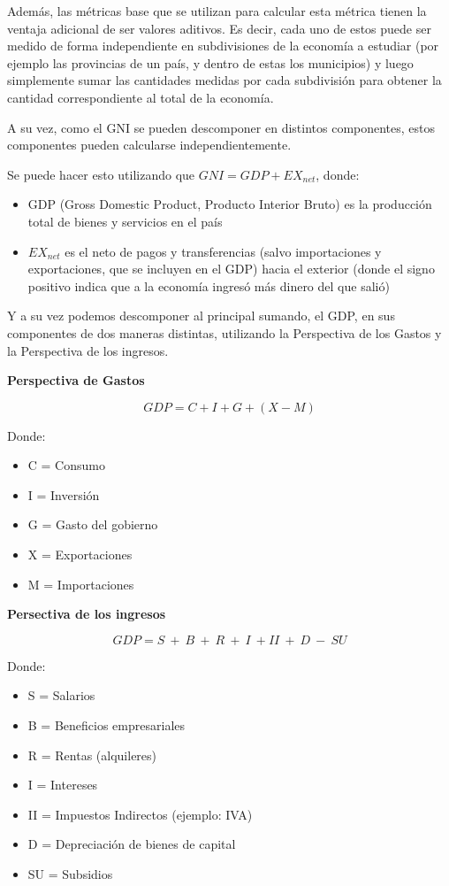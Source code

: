 Además, las métricas base que se utilizan para calcular esta métrica tienen la ventaja adicional de ser valores aditivos. Es decir, cada uno de estos puede ser medido de forma independiente en subdivisiones de la economía a estudiar (por ejemplo las provincias de un país, y dentro de estas los municipios) y luego simplemente sumar las cantidades medidas por cada subdivisión para obtener la cantidad correspondiente al total de la economía. 

A su vez, como el GNI se pueden descomponer en distintos componentes, estos componentes pueden calcularse independientemente.

Se puede hacer esto utilizando que $GNI = GDP + EX_{net}$, donde:
\begin{itemize}
    \item GDP (Gross Domestic Product, Producto Interior Bruto) es la producción total de bienes y servicios en el país
    \item $EX_{net}$ es el neto de pagos y transferencias (salvo importaciones y exportaciones, que se incluyen en el GDP) hacia el exterior (donde el signo positivo indica que a la economía ingresó más dinero del que salió)
\end{itemize}

Y a su vez podemos descomponer al principal sumando, el GDP, en sus componentes de dos maneras distintas, utilizando la Perspectiva de los Gastos y la Perspectiva de los ingresos.

\textbf{Perspectiva de Gastos}

$$
GDP = C + I + G + (X-M)
$$

Donde:
\begin{itemize}
    \item C = Consumo
    \item I = Inversión
    \item G = Gasto del gobierno
    \item X = Exportaciones
    \item M = Importaciones
\end{itemize}

\textbf{Persectiva de los ingresos}

$$
GDP = S\ +\ B\ +\ R\ +\ I\ + II\ +\ D\ -\ SU 
$$

Donde:
\begin{itemize}
    \item S = Salarios
    \item B = Beneficios empresariales
    \item R = Rentas (alquileres)
    \item I = Intereses
    \item II = Impuestos Indirectos (ejemplo: IVA)
    \item D = Depreciación de bienes de capital
    \item SU = Subsidios
\end{itemize}

